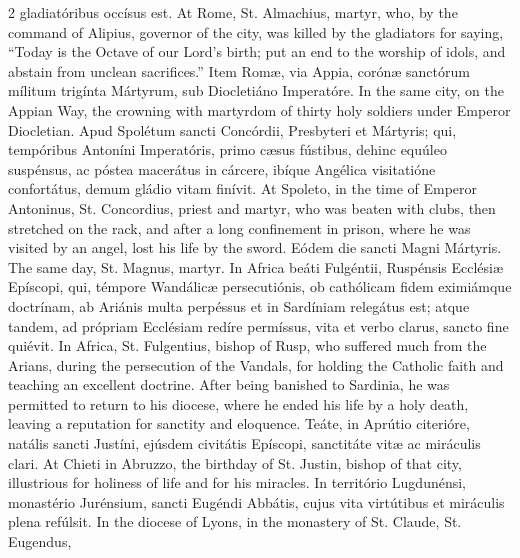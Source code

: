 \begin{paracol}{2}
 gladiatóribus occísus est.
\switchcolumn
{}
At Rome, St. Almachius, martyr, who, by the command of Alipius, governor of 
 the city, was killed by the gladiators for saying, ``Today is the Octave of 
 our Lord's birth; put an end to the worship of idols, and abstain from 
 unclean sacrifices.''
\switchcolumn*
{}
Item Romæ, via Appia, corónæ sanctórum mílitum 
 trigínta Mártyrum, sub Diocletiáno Imperatóre.
\switchcolumn
{}
In the same city, on the Appian Way, the crowning with martyrdom of thirty 
 holy soldiers under Emperor Diocletian.
\switchcolumn*
{}
Apud Spolétum sancti Concórdii, Presbyteri et Mártyris; qui, tempóribus 
 Antoníni Imperatóris, primo cæsus fústibus, 
 dehinc equúleo suspénsus, ac póstea macerátus in cárcere, ibíque Angélica 
 visitatióne confortátus, demum gládio vitam finívit.
\switchcolumn
{}
At Spoleto, in the time of Emperor Antoninus, St. Concordius, priest and 
 martyr, who was beaten with clubs, then stretched on the rack, and after a 
 long confinement in prison, where he was visited by an angel, lost his life 
 by the sword.
\switchcolumn*
{}
Eódem die sancti Magni Mártyris.
\switchcolumn
{}
The same day, St. Magnus, martyr.
\switchcolumn*
{}
In Africa beáti Fulgéntii, Ruspénsis Ecclésiæ 
 Epíscopi, qui, témpore Wandálicæ persecutiónis, ob cathólicam fidem 
 eximiámque doctrínam, ab Ariánis multa perpéssus et in Sardíniam relegátus 
 est; atque tandem, ad própriam Ecclésiam redíre permíssus, vita et verbo 
 clarus, sancto fine quiévit.
\switchcolumn
{}
In Africa, St. Fulgentius, bishop of Rusp, who suffered much from the 
 Arians, during the persecution of the Vandals, for holding the Catholic 
 faith and teaching an excellent doctrine. After being banished to 
 Sardinia, he was permitted to return to his diocese, where he ended his life 
 by a holy death, leaving a reputation for sanctity and eloquence.
\switchcolumn*
{}
Teáte, in Aprútio citerióre, natális sancti Justíni, ejúsdem civitátis 
 Epíscopi, sanctitáte vitæ ac miráculis clari.
\switchcolumn
{}
At Chieti in Abruzzo, the birthday of St. Justin, bishop of that city, 
 illustrious for holiness of life and for his miracles.
\switchcolumn*
{}
In território Lugdunénsi, monastério Jurénsium, sancti Eugéndi Abbátis, 
 cujus vita virtútibus et miráculis plena refúlsit.
\switchcolumn
{}
In the diocese of Lyons, in the monastery of St. Claude, St. Eugendus, 

\end{paracol}
